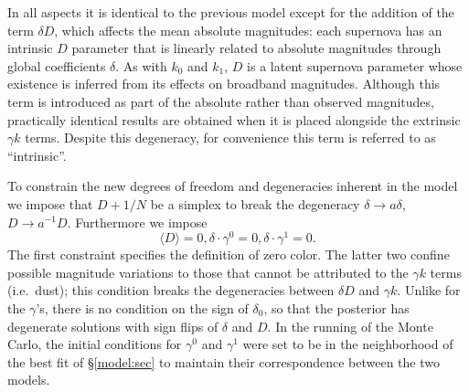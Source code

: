\documentclass{aastex61}   	%
\begin{document}
In all aspects it is identical to the previous model except for the addition of the term $\delta D$,
which affects the mean
absolute magnitudes:
each supernova has an intrinsic $D$ parameter that is linearly related to
absolute magnitudes through global coefficients $\delta$.  As with $k_0$ and $k_1$,  $D$ is a latent supernova parameter whose existence is inferred from
its effects on broadband magnitudes.
Although
this term is introduced as part of the  absolute rather than observed magnitudes,
practically identical results are obtained when it is placed alongside the extrinsic $\gamma k$ terms.  Despite this
degeneracy, for convenience this term is referred to as ``intrinsic''.


To constrain the new degrees of freedom and degeneracies inherent in the model we impose that
$D+1/N$ be a simplex to break the 
degeneracy  $\delta \rightarrow a\delta$, $D \rightarrow a^{-1}D$.
Furthermore we impose
\begin{equation}
\langle D\rangle=0,  \delta \cdot \gamma^0=0, \delta \cdot \gamma^1=0.
\end{equation}
The first constraint specifies the definition of zero color.   The latter two confine possible magnitude
variations to those that cannot be attributed to 
the $\gamma k$ terms (i.e.\ dust); this condition breaks the degeneracies between $\delta D$  
and $\gamma k$. 
Unlike for the $\gamma$'s, there is no condition on the sign of $\delta_0$,
so that the posterior has degenerate solutions with sign flips of $\delta$ and $D$.
In the running of the Monte Carlo, the initial conditions for
$\gamma^0$ and $\gamma^1$ were set to be in the neighborhood of the best fit of \S\ref{model:sec}
to maintain their correspondence between the two models. 
\end{document}
